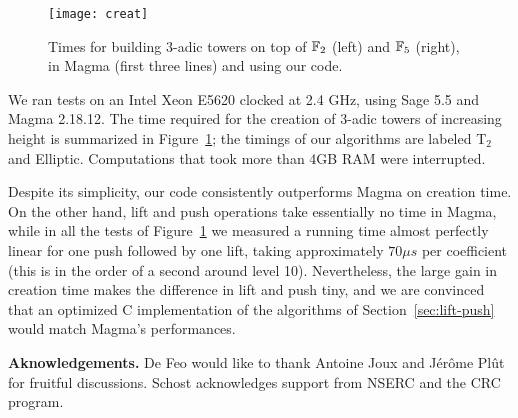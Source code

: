 \documentclass{sig-alternate}
\begin{document}
\begin{figure}
  \centering
  \texttt{[image: creat]}
  \vspace*{-6mm}
  \caption{Times for building $3$-adic towers on top of $\mathbb{F}_2$ (left)
    and $\mathbb{F}_5$ (right), in Magma (first three lines) and using our
    code.}
  \label{fig:build}
  \vspace*{-3mm}
\end{figure}

We ran tests on an Intel Xeon E5620 clocked at 2.4 GHz, using Sage 5.5
and Magma 2.18.12. The time required for the creation of $3$-adic
towers of increasing height is summarized in
Figure~\ref{fig:build}; the timings of our algorithms are labeled 
T$_2$ and Elliptic. Computations that took more than 4GB RAM were
interrupted.

Despite its simplicity, our code consistently outperforms Magma on
creation time. On the other hand, lift and push operations take
essentially no time in Magma, while in all the tests of
Figure~\ref{fig:build} we measured a running time almost perfectly
linear for one push followed by one lift, taking approximately $70\mu
s$ per coefficient (this is in the order of a second around level
10). Nevertheless, the large gain in creation time makes the
difference in lift and push tiny, and we are convinced that an
optimized C implementation of the algorithms of
Section~\ref{sec:lift-push} would match Magma's performances.


\bigskip\noindent \textbf{Aknowledgements.}  De Feo would like to thank Antoine
Joux and J\'er\^ome Pl\^ut for fruitful discussions. Schost acknowledges
support from NSERC and the CRC program.

\scriptsize


\end{document}
